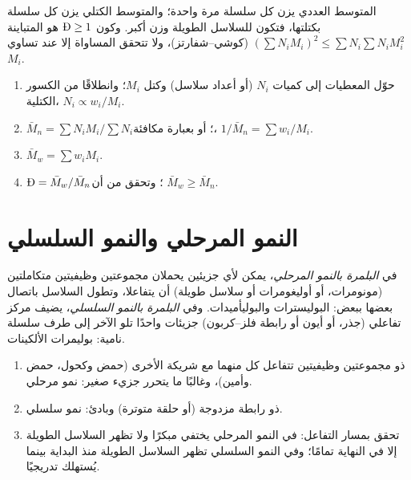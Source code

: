 المتوسط العددي يزن كل سلسلة مرة واحدة؛ والمتوسط الكتلي يزن كل سلسلة بكتلتها، فتكون
للسلاسل الطويلة وزن أكبر. وكون $\text{\DH} \ge 1$ هو المتباينة $\left(\sum N_i M_i\right)^2 \le
\sum N_i \sum N_i M_i^2$ (كوشي--شفارتز)، ولا تتحقق المساواة إلا عند تساوي $M_i$.

\begin{method}\label{met:b2:polymer-synthesis:averages}
\begin{enumerate}
  \item حوّل المعطيات إلى كميات $N_i$ (أو أعداد سلاسل) وكتل $M_i$؛ وانطلاقًا من الكسور الكتلية،
        $N_i \propto w_i/M_i$.
  \item $\bar M_n = \sum N_i M_i / \sum N_i$؛ أو بعبارة مكافئة، $1/\bar M_n = \sum w_i/M_i$.
  \item $\bar M_w = \sum w_i M_i$.
  \item $\text{\DH} = \bar M_w/\bar M_n$؛ وتحقق من أن $\bar M_w \ge \bar M_n$.
\end{enumerate}
\end{method}

\section{النمو المرحلي والنمو السلسلي}

\begin{definition}\label{def:b2:polymer-synthesis:step-chain}
في \emph{البلمرة بالنمو المرحلي}، يمكن لأي جزيئين يحملان
مجموعتين وظيفيتين متكاملتين (مونومرات، أو أوليغومرات أو سلاسل طويلة) أن يتفاعلا، وتطول
السلاسل باتصال بعضها ببعض: البوليسترات والبوليأميدات. وفي \emph{البلمرة بالنمو
السلسلي}، يضيف مركز تفاعلي (جذر، أو أيون أو رابطة فلز--كربون)
جزيئات  واحدًا تلو الآخر إلى طرف سلسلة نامية: بوليمرات الألكينات.
\end{definition}

\begin{method}\label{met:b2:polymer-synthesis:classify}
\begin{enumerate}
  \item {} ذو مجموعتين وظيفيتين تتفاعل كل منهما مع شريكة الأخرى (حمض وكحول،
        حمض وأمين)، وغالبًا ما يتحرر جزيء صغير: نمو مرحلي.
  \item {} ذو رابطة مزدوجة  (أو حلقة متوترة) وبادئ: نمو سلسلي.
  \item تحقق بمسار التفاعل: في النمو المرحلي يختفي  مبكرًا ولا تظهر السلاسل الطويلة
        إلا في النهاية تمامًا؛ وفي النمو السلسلي تظهر السلاسل الطويلة منذ البداية بينما يُستهلك 
        تدريجيًا.
\end{enumerate}
\end{method}

